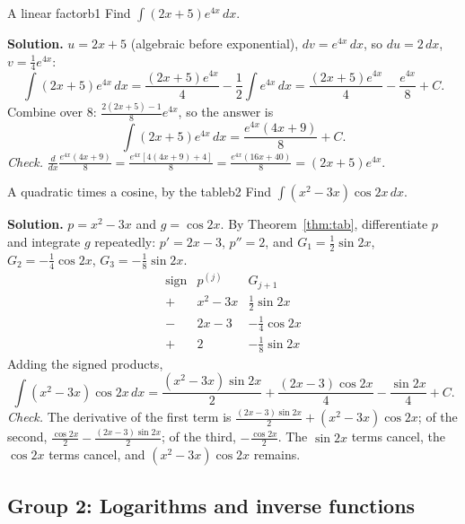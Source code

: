 \documentclass[11pt]{article}
\begin{document}
\begin{exmp}{A linear factor}{b1}
Find $\int(2x+5)e^{4x}\,dx$.

\textbf{Solution.} $u=2x+5$ (algebraic before exponential), $dv=e^{4x}\,dx$, so $du=2\,dx$, $v=\frac14e^{4x}$:
\[\int(2x+5)e^{4x}\,dx=\frac{(2x+5)e^{4x}}4-\frac12\int e^{4x}\,dx=\frac{(2x+5)e^{4x}}4-\frac{e^{4x}}8+C .\]
Combine over $8$: $\frac{2(2x+5)-1}8e^{4x}$, so the answer is
\[\int(2x+5)e^{4x}\,dx=\frac{e^{4x}(4x+9)}8+C .\]
\emph{Check.} $\frac{d}{dx}\frac{e^{4x}(4x+9)}8=\frac{e^{4x}\left[4(4x+9)+4\right]}8=\frac{e^{4x}(16x+40)}8=(2x+5)e^{4x}$.
\end{exmp}

\begin{exmp}{A quadratic times a cosine, by the table}{b2}
Find $\int\left(x^2-3x\right)\cos2x\,dx$.

\textbf{Solution.} $p=x^2-3x$ and $g=\cos2x$. By Theorem~\ref{thm:tab}, differentiate $p$ and integrate $g$ repeatedly: $p'=2x-3$, $p''=2$, and $G_1=\frac12\sin2x$, $G_2=-\frac14\cos2x$, $G_3=-\frac18\sin2x$.
\[\begin{array}{c|c|c}\text{sign}&p^{(j)}&G_{j+1}\\\hline+&x^2-3x&\frac12\sin2x\\-&2x-3&-\frac14\cos2x\\+&2&-\frac18\sin2x\end{array}\]
Adding the signed products,
\[\int\left(x^2-3x\right)\cos2x\,dx=\frac{(x^2-3x)\sin2x}2+\frac{(2x-3)\cos2x}4-\frac{\sin2x}4+C .\]
\emph{Check.} The derivative of the first term is $\frac{(2x-3)\sin2x}2+(x^2-3x)\cos2x$; of the second, $\frac{\cos2x}2-\frac{(2x-3)\sin2x}2$; of the third, $-\frac{\cos2x}2$. The $\sin2x$ terms cancel, the $\cos2x$ terms cancel, and $(x^2-3x)\cos2x$ remains.
\end{exmp}

\subsection*{Group 2: Logarithms and inverse functions}
\end{document}

